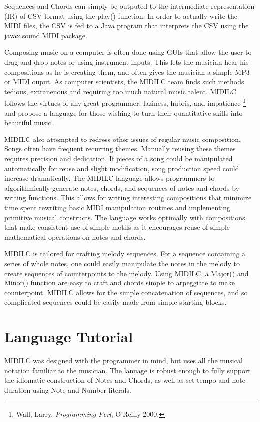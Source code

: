 \documentclass[12pt,A4]{book}
\begin{document}
Sequences and Chords can simply be outputed to the intermediate representation (IR) of CSV format using the play() function. In order to actually write the MIDI files, the CSV is fed to a Java program that interprets the CSV using the javax.sound.MIDI package.

Composing music on a computer is often done using GUIs that allow the user to drag and drop notes or using instrument inputs. This lets the musician hear his compositions as he is creating them, and often gives the musician a simple MP3 or MIDI ouput. As computer scientists, the MIDILC team finds such methods tedious, extraneuous and requiring too much natural music talent. MIDILC follows the virtues of any great programmer: laziness, hubris, and impatience \footnote{Wall, Larry. \textit{Programming Perl}, O'Reilly 2000.} and propose a language for those wishing to turn their quantitative skills into beautiful music.

MIDILC also attempted to redress other issues of regular music composition. Songs often have frequent recurring themes. Manually reusing these themes requires precision and dedication. If pieces of a song could be manipulated automatically for reuse and slight modification, song production speed could increase dramatically. The MIDILC language allows programmers to algorithmically generate notes, chords, and sequences of notes and chords by writing functions. This allows for writing interesting compositions that minimize time spent rewriting basic MIDI manipulation routines and implementing primitive musical constructs. The language works optimally with compositions that make consistent use of simple motifs as it encourages reuse of simple mathematical operations on notes and chords. 

MIDILC is tailored for crafting melody sequences. For a sequence containing a series of whole notes, one could easily manipulate the notes in the melody to create sequences of counterpoints to the melody. Using MIDILC, a Major() and Minor() function are easy to craft and chords simple to arpeggiate to make counterpoint. MIDILC allows for the simple concatenation of sequences, and so complicated sequences could be easily made from simple starting blocks.

\chapter{Language Tutorial}
MIDILC was designed with the programmer in mind, but uses all the musical notation familiar to the musician. The lanuage is robust enough to fully support the idiomatic construction of Notes and Chords, as well as set tempo and note duration using Note and Number literals.
\end{document}
